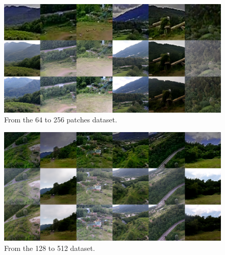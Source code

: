 \begin{figure}[H]
  \centering
  \includegraphics[scale=0.37]{figures/allegati/realesrgan64p.png}
  \caption{From the 64 to 256 patches dataset.}
  \label{img:realesrgan_training}
\end{figure}

\begin{figure}[H]
  \centering
  \includegraphics[scale=0.39]{figures/allegati/realesrgan128.png}
  \caption{From the 128 to 512 dataset.}
  \label{img:realesrgan_training}
\end{figure}
